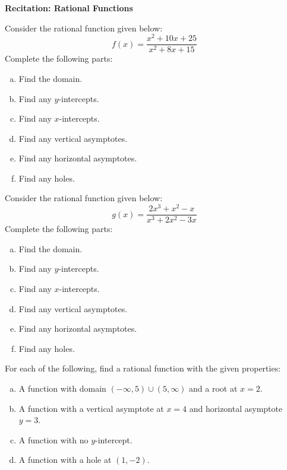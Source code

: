\documentclass[11pt,letterpaper]{article}
\begin{document}

\phantom{} \hfill {\bfseries \Large Recitation: Rational Functions} \hfill \phantom{} \par\vspace{0.5cm}

 Consider the rational function given below:
	\[
	f(x)= \dfrac{x^2 + 10x + 25}{x^2 + 8x + 15}
	\]
Complete the following parts:
	\begin{enumerate}[(a)]
	\item Find the domain.
	\item Find any $y$-intercepts.
	\item Find any $x$-intercepts.
	\item Find any vertical asymptotes. 
	\item Find any horizontal asymptotes.
	\item Find any holes.
	\end{enumerate} \vfill



 Consider the rational function given below:
	\[
	g(x)= \dfrac{2x^3 + x^2 - x}{x^3 + 2x^2 - 3x}
	\]
Complete the following parts:
	\begin{enumerate}[(a)]
	\item Find the domain.
	\item Find any $y$-intercepts.
	\item Find any $x$-intercepts.
	\item Find any vertical asymptotes. 
	\item Find any horizontal asymptotes.
	\item Find any holes.
	\end{enumerate} \vfill



\newpage



 For each of the following, find a rational function with the given properties: 
	\begin{enumerate}[(a)]
	\item A function with domain $(-\infty, 5) \cup (5, \infty)$ and a root at $x= 2$.
	\item A function with a vertical asymptote at $x= 4$ and horizontal asymptote $y= 3$.
	\item A function with no $y$-intercept.
	\item A function with a hole at $(1, -2)$.
	\end{enumerate} \par\vspace{8cm}
\end{document}

